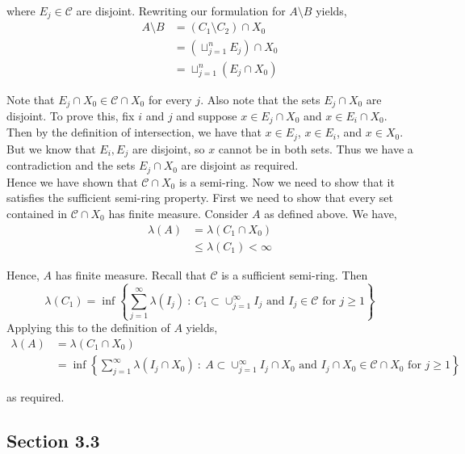 \documentclass[12pt]{article}
\newenvironment{problem}[2][Problem]{\begin{trivlist}
\item[\hskip \labelsep {\bfseries #1}\hskip \labelsep {\bfseries #2.}]}{\end{trivlist}}
\begin{document}
where $E_j \in \mathcal{C}$ are disjoint. Rewriting our formulation for $A \setminus B$ yields,
\begin{align*}
A \setminus B &= (C_1 \setminus C_2) \cap X_0\\
&= (\sqcup_{j=1}^n E_j) \cap X_0\\
&= \sqcup_{j=1}^n (E_j \cap X_0)
\end{align*}

Note that $E_j \cap X_0 \in \mathcal{C} \cap X_0$ for every $j$. Also note that the sets $E_j \cap X_0$ are disjoint. To prove this, fix $i$ and $j$ and suppose $x \in E_j \cap X_0$ and $x \in E_i \cap X_0$. Then by the definition of intersection, we have that $x \in E_j$, $x \in E_i$, and $x \in X_0$. But we know that $E_i, E_j$ are disjoint, so $x$ cannot be in both sets. Thus we have a contradiction and the sets $E_j \cap X_0$ are disjoint as required.\\

Hence we have shown that $\mathcal{C} \cap X_0$ is a semi-ring. Now we need to show that it satisfies the sufficient semi-ring property. First we need to show that every set contained in $\mathcal{C} \cap X_0$ has finite measure. Consider $A$ as defined above. We have,
\begin{align*}
\lambda(A) &= \lambda(C_1 \cap X_0)\\
&\leq \lambda(C_1) < \infty
\end{align*}

Hence, $A$ has finite measure. Recall that $\mathcal{C}$ is a sufficient semi-ring. Then $$\lambda(C_1) = \inf \left\{ \sum_{j=1}^{\infty} \lambda(I_j) \ : \ C_1 \subset \cup_{j=1}^{\infty}I_j \text{ and } I_j \in \mathcal{C} \text{ for } j \geq 1 \right\}$$ Applying this to the definition of $A$ yields,
\begin{align*}
\lambda(A) &= \lambda(C_1 \cap X_0)\\
&= \inf \left\{ \sum_{j=1}^{\infty} \lambda(I_j \cap X_0) \ : \ A \subset \cup_{j=1}^{\infty} I_j \cap X_0 \text{ and } I_j \cap X_0 \in \mathcal{C} \cap X_0 \text{ for } j \geq 1 \right\}
\end{align*} 

as required.

\begin{problem}{6}
\end{problem}

\begin{problem}{7}
\end{problem}

\subsection{Section 3.3}
\end{document}
